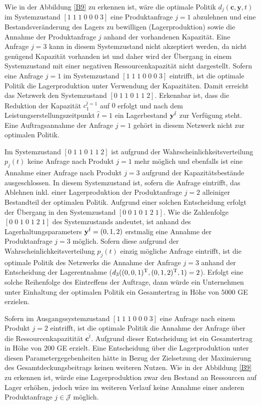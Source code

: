 Wie in der Abbildung \ref{B9} zu erkennen ist, wäre die optimale Politik $d_{j}({\textbf{c},\textbf{y}, t})$ im Systemzustand $[1\;1\;1\;0\;0\;0\;3]$ eine Produktanfrage $j=1$ abzulehnen und eine Bestandsveränderung des Lagers zu bewilligen (Lagerproduktion) sowie die Annahme der Produktanfrage $j$ anhand der vorhandenen Kapazität. Eine Anfrage $j=3$ kann in diesem Systemzustand nicht akzeptiert werden, da nicht genügend Kapazität vorhanden ist und daher wird der Übergang in einem Systemzustand mit einer negativen Ressourcenkapazität nicht dargestellt. Sofern eine Anfrage $j=1$ im Systemzustand $[1\;1\;1\;0\;0\;0\;3]$ eintrifft, ist die optimale Politik die Lagerproduktion unter Verwendung der Kapazitäten. Damit erreicht das Netzwerk den Systemzustand $[0\;1\;1\;0\;1\;1\;2]$. Erkennbar ist, dass die Reduktion der Kapazität $c_1^{\hat t=1}$ auf $0$ erfolgt und nach dem Leistungserstellungszeitpunkt $\hat t = 1$ ein Lagerbestand $\textbf y^{\hat t}$ zur Verfügung steht. Eine Auftragsannahme der Anfrage $j=1$ gehört in diesem Netzwerk nicht zur optimalen Politik.

Im Systemzustand $[0\;1\;1\;0\;1\;1\;2]$ ist aufgrund der Wahrscheinlichkeitsverteilung $p_j(t)$ keine Anfrage nach Produkt $j=1$ mehr möglich und ebenfalls ist eine Annahme einer Anfrage nach Produkt $j=3$ aufgrund der Kapazitätsbestände ausgeschlossen. In diesem Systemzustand ist, sofern die Anfrage eintrifft, das Ablehnen inkl. einer Lagerproduktion der Produktanfrage $j=2$ alleiniger Bestandteil der optimalen Politik. Aufgrund einer solchen Entscheidung erfolgt der Übergang in den Systemzustand $[0\;0\;1\;0\;1\;2\;1]$. Wie die Zahlenfolge $[0\;0\;1\;0\;1\;2\;1]$ des Systemzustands andeutet, ist anhand des Lagerhaltungsparameters $\textbf y^{\hat t}=(0,1,2)$ erstmalig eine Annahme der Produktanfrage $j=3$ möglich. Sofern diese aufgrund der Wahrscheinlichkeitsverteilung $p_j(t)$ einzig mögliche Anfrage eintrifft, ist die optimale Politik des Netzwerks die Annahme der Anfrage $j=3$ anhand der Entscheidung der Lagerentnahme ($d_{3}((0,0,1)^{\textnormal T},(0,1,2)^{\textnormal T}, 1)=2$). Erfolgt eine solche Reihenfolge des Eintreffens der Auftrage, dann würde ein Unternehmen unter Einhaltung der optimalen Politik ein Gesamtertrag in Höhe von $5000$ GE erzielen.

Sofern im Ausgangssystemzustand $[1\;1\;1\;0\;0\;0\;3]$ eine Anfrage nach einem Produkt $j=2$ eintrifft, ist die optimale Politik die Annahme der Anfrage über die Ressourcenkapazitität $\textbf{c}^{\hat t}$. Aufgrund dieser Entscheidung ist ein Gesamtertrag in Höhe von $200$ GE erzielt. Eine Entscheidung über die Lagerproduktion unter diesen Parametergegebenheiten hätte in Bezug der Zielsetzung der Maximierung des Gesamtdeckungsbeitrags keinen weiteren Nutzen. Wie in der Abbildung \ref{B9} zu erkennen ist, würde eine Lagerproduktion zwar den Bestand an Ressourcen auf Lager erhöhen, jedoch wäre im weiteren Verlauf keine Annahme einer anderen Produktanfrage $j\in\mathcal J$ möglich. %

